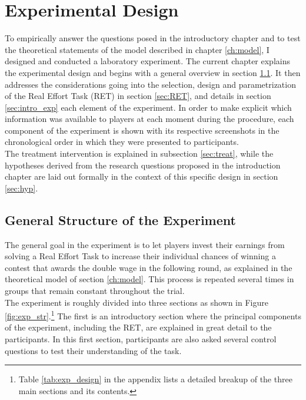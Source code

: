     \chapter{Experimental Design}
    \label{ch:experiment}
    \thispagestyle{fancy}

    To empirically answer the questions posed in the introductory chapter and to test the theoretical statements of the model described in chapter \ref{ch:model}, I designed and conducted a laboratory experiment. The current chapter explains the experimental design and begins with a general overview in section \ref{sec:gen_str}. It then addresses the considerations going into the selection, design and parametrization of the Real Effort Task (RET) in section \ref{sec:RET}, and details in section \ref{sec:intro_exp} each element of the experiment. In order to make explicit which information was available to players at each moment during the procedure, each component of the experiment is shown with its respective screenshots in the chronological order in which they were presented to participants.\\
    
    The treatment intervention is explained in subsection \ref{sec:treat}, while the hypotheses derived from the research questions proposed in the introduction chapter are laid out formally in the context of this specific design in section \ref{sec:hyp}.
    
\section{General Structure of the Experiment}
\label{sec:gen_str}
    
    The general goal in the experiment is to let players invest their earnings from solving a Real Effort Task to increase their individual chances of winning a contest that awards the double wage in the following round, as explained in the theoretical model of section \ref{ch:model}. This process is repeated several times in groups that remain constant throughout the trial.\\ 
    

    The experiment is roughly divided into three sections as shown in Figure \ref{fig:exp_str}.\footnote{ Table \ref{tab:exp_design} in the appendix lists a detailed breakup of the three main sections and its contents.} The first is an introductory section where the principal components of the experiment, including the RET, are explained in great detail to the participants. In this first section, participants are also asked several control questions to test their understanding of the task.\\
    
